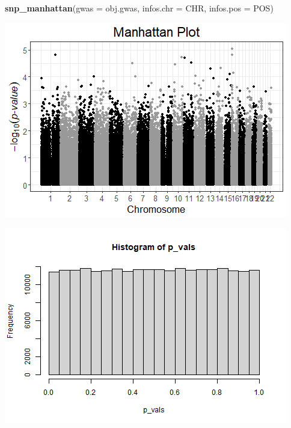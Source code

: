 \documentclass[
]{article}
\newenvironment{Shaded}{\begin{snugshade}}{\end{snugshade}}
\newcommand{\CommentTok}[1]{\textcolor[rgb]{0.56,0.35,0.01}{\textit{#1}}}
\newcommand{\DataTypeTok}[1]{\textcolor[rgb]{0.13,0.29,0.53}{#1}}
\newcommand{\DecValTok}[1]{\textcolor[rgb]{0.00,0.00,0.81}{#1}}
\newcommand{\KeywordTok}[1]{\textcolor[rgb]{0.13,0.29,0.53}{\textbf{#1}}}
\newcommand{\NormalTok}[1]{#1}
\newcommand{\OperatorTok}[1]{\textcolor[rgb]{0.81,0.36,0.00}{\textbf{#1}}}
\newcommand{\StringTok}[1]{\textcolor[rgb]{0.31,0.60,0.02}{#1}}
\begin{document}
\begin{Shaded}
\begin{Highlighting}[]
\KeywordTok{snp_manhattan}\NormalTok{(}\DataTypeTok{gwas =}\NormalTok{ obj.gwas, }\DataTypeTok{infos.chr =}\NormalTok{ CHR, }\DataTypeTok{infos.pos =}\NormalTok{ POS)}
\end{Highlighting}
\end{Shaded}

\includegraphics{stats-gene-research-progress-v8_files/figure-latex/unnamed-chunk-2-2.png}

\begin{Shaded}
\end{Shaded}

\includegraphics{stats-gene-research-progress-v8_files/figure-latex/unnamed-chunk-2-3.png}
\end{document}
